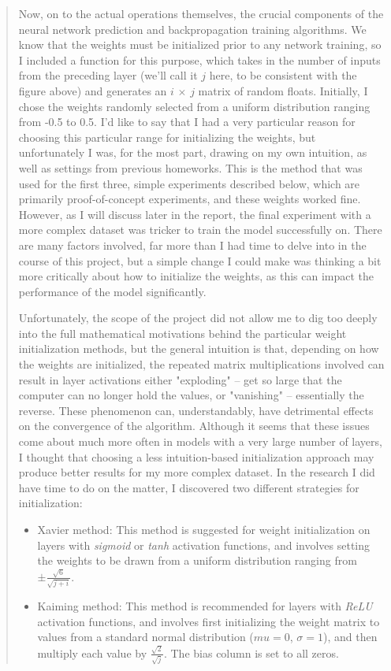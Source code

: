 \documentclass{article}
\begin{document}
\begin{quote}
Now, on to the actual operations themselves, the crucial components of the neural network prediction and backpropagation training algorithms. We know that the weights must be initialized prior to any network training, so I included a function for this purpose, which takes in the number of inputs from the preceding layer (we'll call it $j$ here, to be consistent with the figure above) and generates an $i$ $\times$ $j$ matrix of random floats. Initially, I chose the weights randomly selected from a uniform distribution ranging from -0.5 to 0.5. I'd like to say that I had a very particular reason for choosing this particular range for initializing the weights, but unfortunately I was, for the most part, drawing on my own intuition, as well as settings from previous homeworks. This is the method that was used for the first three, simple experiments described below, which are primarily proof-of-concept experiments, and these weights worked fine. However, as I will discuss later in the report, the final experiment with a more complex dataset was tricker to train the model successfully on. There are many factors involved, far more than I had time to delve into in the course of this project, but a simple change I could make was thinking a bit more critically about how to initialize the weights, as this can impact the performance of the model significantly.

Unfortunately, the scope of the project did not allow me to dig too deeply into the full mathematical motivations behind the particular weight initialization methods, but the general intuition is that, depending on how the weights are initialized, the repeated matrix multiplications involved can result in layer activations either "exploding" -- get so large that the computer can no longer hold the values, or "vanishing" -- essentially the reverse. These phenomenon can, understandably, have detrimental effects on the convergence of the algorithm. Although it seems that these issues come about much more often in models with a very large number of layers, I thought that choosing a less intuition-based initialization approach may produce better results for my more complex dataset. In the research I did have time to do on the matter, I discovered two different strategies for initialization:

\begin{itemize}
	\item [] Xavier method: This method is suggested for weight initialization on layers with \textit{sigmoid} or \textit{tanh} activation functions, and involves setting the weights to be drawn from a uniform distribution ranging from $\pm\frac{\sqrt{6}}{\sqrt{j + i}}$. 
	\item [] Kaiming method: This method is recommended for layers with \textit{ReLU} activation functions, and involves first initializing the weight matrix to values from a standard normal distribution  ($mu=0$, $\sigma=1$), and then multiply each value by $\frac{\sqrt{2}}{\sqrt{j}}$. The bias column is set to all zeros.
\end{itemize}


\end{quote}
\end{document}
